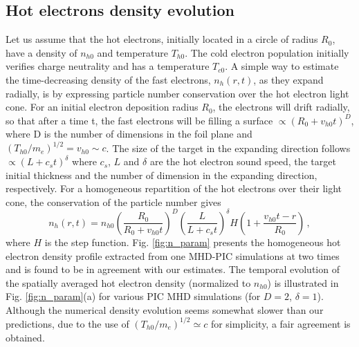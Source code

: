 \documentclass[aps,showpacs,superscriptaddress]{revtex4}
\begin{document}
\subsection{Hot electrons density evolution}
Let us assume that the hot electrons, initially located in a circle of radius $R_0$, have a density of $n_{h0}$ and temperature $T_{h0}$. The cold electron  population initially verifies charge neutrality and has a temperature $T_{c0}$.
A simple way to estimate the time-decreasing density of the fast electrons, $n_h(r,t)$, as they expand radially, is by expressing particle number conservation over the hot electron light cone.
For an initial electron  deposition radius $R_0$, the electrons will drift radially, so that after a time t, the fast electrons will be  filling a surface $\propto ( R_0 + v_{h0}t)^D$, where D is the number of dimensions in the foil plane and $(T_{h0}/m_e)^{1/2}= v_{h0}\sim c$.
The size of the target in the expanding direction follows $\propto (L+c_st)^\delta$ where $c_s$, $L$ and $\delta$ are  the hot electron sound speed, the target initial thickness and the number of dimension in the expanding direction, respectively. 
For a homogeneous repartition of the hot electrons over their light cone, the conservation of the particle number gives
\begin{equation} \label{eq:nt}
n_h(r,t)  = n_{h0} \left( \frac{R_0}{R_0 + v_{h0}t } \right)^D \left( \frac{L}{L + c_{s}t } \right)^\delta  H \left( 1 + \frac{v_{h0}t-r}{R_0} \right) \, ,
\end{equation}
where $H$ is the step function.
Fig.  \ref{fig:n_param} presents the  homogeneous  hot electron density profile extracted from one  MHD-PIC simulations at two times  and is found to be in agreement with our estimates.
The temporal evolution of the spatially averaged hot electron density (normalized to $n_{h0}$) is illustrated in Fig. \ref{fig:n_param}(a) for various PIC MHD simulations (for $D=2$, $\delta=1$). Although the numerical density evolution seems somewhat slower than our predictions, due to the use of   $(T_{h0}/m_e)^{1/2} \simeq c$ for simplicity, a fair agreement is obtained.
\end{document}
